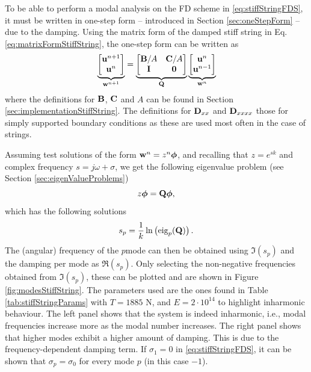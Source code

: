 {To be able to perform a modal analysis on the FD scheme in \eqref{eq:stiffStringFDS}, it must be written in one-step form -- introduced in Section \ref{sec:oneStepForm} -- due to the damping. Using the matrix form of the damped stiff string in Eq. \eqref{eq:matrixFormStiffString}, the one-step form can be written as
\begin{equation}\label{eq:oneStepFormStiffSTring}
    \underbrace{\begin{bmatrix}
        \mathbf{u}^{n+1}\\
        \mathbf{u}^n
    \end{bmatrix}}_{\mathbf{w}^{n+1}} = 
    \underbrace{\begin{bmatrix}
        \mathbf{B}/A & \mathbf{C}/A\\
        \mathbf{I} & \mathbf{0}
    \end{bmatrix}}_{\mathbf{Q}}
    \underbrace{\begin{bmatrix}
        \mathbf{u}^n\\
        \mathbf{u}^{n-1}
    \end{bmatrix}}_{\mathbf{w}^n}
\end{equation}
where the definitions for $\mathbf{B}$, $\mathbf{C}$ and $A$ can be found in Section \ref{sec:implementationStiffString}. The definitions for $\mathbf{D}_{xx}$ and $\mathbf{D}_{xxxx}$ those for simply supported boundary conditions as these are used most often in the case of strings.

Assuming test solutions of the form $\mathbf{w}^n = z^n\boldsymbol{\phi}$, and recalling that $z=e^{sk}$ and complex frequency $s = j\omega + \sigma$, we get the following eigenvalue problem (see Section \ref{sec:eigenValueProblems})
\begin{equation}
    z\boldsymbol{\phi} = \mathbf{Q} \boldsymbol{\phi},
\end{equation}
which has the following solutions
\begin{equation}
    s_p = \frac{1}{k}\ln \left(\text{eig}_p(\mathbf{Q})\right).
\end{equation}
The (angular) frequency of the $p$\th mode can then be obtained using $\mathfrak{I}(s_p)$ and the damping per mode as $\mathfrak{R}(s_p)$. Only selecting the non-negative frequencies obtained from $\mathfrak{I}(s_p)$, these can be plotted and are shown in Figure \ref{fig:modesStiffString}. The parameters used are the ones found in Table \ref{tab:stiffStringParams} with $T = 1885$ N, and $E = 2\cdot 10^{14}$ to highlight inharmonic behaviour. The left panel shows that the system is indeed inharmonic, i.e., modal frequencies increase more as the modal number increases. The right panel shows that higher modes exhibit a higher amount of damping. This is due to the frequency-dependent damping term. If $\sigma_1 = 0$ in \eqref{eq:stiffStringFDS}, it can be shown that $\sigma_p = \sigma_0$ for every mode $p$ (in this case $-1$).

}
